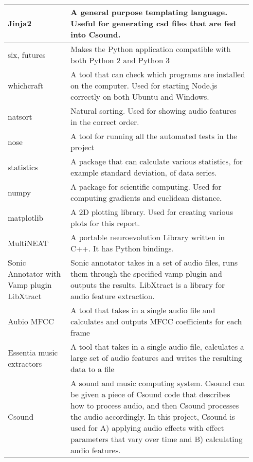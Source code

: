 \begin{center}
\begin{longtable}{p{3.3cm} p{13cm}}
\midrule
Jinja2 & A general purpose templating language. Useful for generating csd files that are fed into Csound. \\
\midrule
six, futures & Makes the Python application compatible with both Python 2 and Python 3 \\
\midrule
whichcraft & A tool that can check which programs are installed on the computer. Used for starting Node.js correctly on both Ubuntu and Windows. \\
\midrule
natsort & Natural sorting. Used for showing audio features in the correct order. \\
\midrule
nose & A tool for running all the automated tests in the project \\
\midrule
statistics & A package that can calculate various statistics, for example standard deviation, of data series. \\
\midrule
numpy & A package for scientific computing. Used for computing gradients and euclidean distance. \\
\midrule
matplotlib & A 2D plotting library. Used for creating various plots for this report. \\
\midrule
MultiNEAT & A portable neuroevolution Library written in C++. It has Python bindings. \\
\midrule
Sonic Annotator with Vamp plugin LibXtract & Sonic annotator takes in a set of audio files, runs them through the specified vamp plugin and outputs the results. LibXtract is a library for audio feature extraction. \\
\midrule
Aubio MFCC & A tool that takes in a single audio file and calculates and outputs MFCC coefficients for each frame \\
\midrule
Essentia music extractors & A tool that takes in a single audio file, calculates a large set of audio features and writes the resulting data to a file \\
\midrule
Csound & A sound and music computing system. Csound can be given a piece of Csound code that describes how to process audio, and then Csound processes the audio accordingly. In this project, Csound is used for A) applying audio effects with effect parameters that vary over time and B) calculating audio features. \\

\end{longtable}
\end{center}
